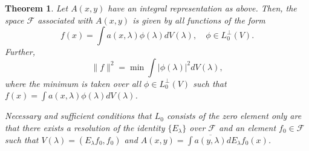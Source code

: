 \documentclass{article}
\newtheorem{theorem}{Theorem}
\begin{document}
\begin{theorem}
\label{thm:integral-space}
Let $A(x, y)$ have an integral representation as above. Then, the space $\mathcal{F}$ associated with $A(x, y)$ is given by all functions of the form
\begin{equation}
f(x) = \int a(x, \lambda) \phi(\lambda) dV(\lambda), \quad \phi \in L_0^{\perp}(V).
\label{eq:function-representation}
\end{equation}
Further,
\begin{equation}
\|f\|^2 = \min \int |\phi(\lambda)|^2 dV(\lambda),
\label{eq:norm-representation}
\end{equation}
where the minimum is taken over all $\phi \in L_0^{\perp}(V)$ such that $f(x) = \int a(x, \lambda) \phi(\lambda) dV(\lambda)$.

Necessary and sufficient conditions that $L_0$ consists of the zero element only are that there exists a resolution of the identity $\{E_\lambda\}$ over $\mathcal{F}$ and an element $f_0 \in \mathcal{F}$ such that $V(\lambda) = (E_\lambda f_0, f_0)$ and $A(x, y) = \int \overline{a(y, \lambda)} dE_\lambda f_0(x)$.
\end{theorem}
\end{document}
